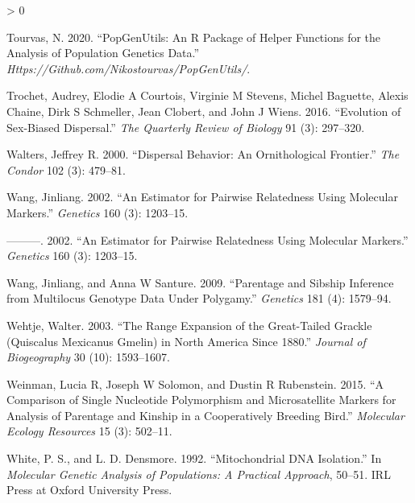 \documentclass[
]{article}
\newlength{\cslhangindent}
\newenvironment{CSLReferences}[2] %
 {%
  \setlength{\parindent}{0pt}
  \ifodd #1 \everypar{\setlength{\hangindent}{\cslhangindent}}\ignorespaces\fi
  \ifnum #2 > 0
  \setlength{\parskip}{#2\baselineskip}
  \fi
 }%
 {}
\begin{document}
\begin{CSLReferences}{1}{0}
\leavevmode\hypertarget{ref-Tourvas2020popgenutils}{}%
Tourvas, N. 2020. {``PopGenUtils: An {R} Package of Helper Functions for
the Analysis of Population Genetics Data.''}
\emph{Https://Github.com/Nikostourvas/PopGenUtils/}.

\leavevmode\hypertarget{ref-trochet2016evolution}{}%
Trochet, Audrey, Elodie A Courtois, Virginie M Stevens, Michel Baguette,
Alexis Chaine, Dirk S Schmeller, Jean Clobert, and John J Wiens. 2016.
{``Evolution of Sex-Biased Dispersal.''} \emph{The Quarterly Review of
Biology} 91 (3): 297--320.

\leavevmode\hypertarget{ref-walters2000dispersal}{}%
Walters, Jeffrey R. 2000. {``Dispersal Behavior: An Ornithological
Frontier.''} \emph{The Condor} 102 (3): 479--81.

\leavevmode\hypertarget{ref-wang2002estimator}{}%
Wang, Jinliang. 2002. {``An Estimator for Pairwise Relatedness Using
Molecular Markers.''} \emph{Genetics} 160 (3): 1203--15.

\leavevmode\hypertarget{ref-wang2002estimator}{}%
---------. 2002. {``An Estimator for Pairwise Relatedness Using
Molecular Markers.''} \emph{Genetics} 160 (3): 1203--15.

\leavevmode\hypertarget{ref-wang2009parentage}{}%
Wang, Jinliang, and Anna W Santure. 2009. {``Parentage and Sibship
Inference from Multilocus Genotype Data Under Polygamy.''}
\emph{Genetics} 181 (4): 1579--94.

\leavevmode\hypertarget{ref-wehtje2003range}{}%
Wehtje, Walter. 2003. {``The Range Expansion of the Great-Tailed Grackle
(Quiscalus Mexicanus Gmelin) in North America Since 1880.''}
\emph{Journal of Biogeography} 30 (10): 1593--1607.

\leavevmode\hypertarget{ref-weinman2015comparison}{}%
Weinman, Lucia R, Joseph W Solomon, and Dustin R Rubenstein. 2015. {``A
Comparison of Single Nucleotide Polymorphism and Microsatellite Markers
for Analysis of Parentage and Kinship in a Cooperatively Breeding
Bird.''} \emph{Molecular Ecology Resources} 15 (3): 502--11.

\leavevmode\hypertarget{ref-white1992mitochondrial}{}%
White, P. S., and L. D. Densmore. 1992. {``Mitochondrial DNA
Isolation.''} In \emph{Molecular Genetic Analysis of Populations: A
Practical Approach}, 50--51. IRL Press at Oxford University Press.

\end{CSLReferences}
\end{document}
